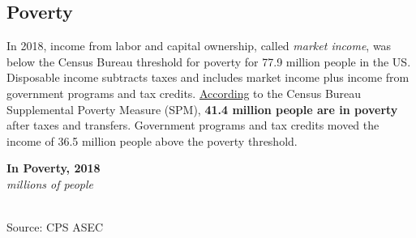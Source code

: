 \documentclass{report}
\newcommand{\barylab}[2]{yticklabel style={text width=#1, align=right, 
		style={black!70}, text height=#2},}
\newcommand{\bbar}[2]{extra #1 ticks = {{#2}}, extra #1 tick labels = ,
		extra #1 tick style = {grid=major, grid style={thick, black!25}},}
\newcommand{\barplotnogrid}{xbar=0pt, axis line style={draw=none},
	    yticklabel style={align=left, anchor=east},
      		xmajorticks=false, ymajorgrids=false,   
	    ytick=data, tickwidth=0pt, area legend, reverse legend,
	    nodes near coords, nodes near coords align={horizontal},}
\begin{document}
{{{{{\newpage
\subsection*{\color{black!70} \seriffont Poverty}
\begin{minipage}{0.46\textwidth}
\small
In 2018, income from labor and capital ownership, called \textit{market income}, was below the Census Bureau threshold for poverty for 77.9 million people in the US. Disposable income subtracts taxes and includes market income plus income from government programs and tax credits. \href{https://www.census.gov/library/publications/2019/demo/p60-268.html}{According} to the Census Bureau Supplemental Poverty Measure (SPM), \textbf{41.4 million people are in poverty} after taxes and transfers. Government programs and tax credits moved the income of 36.5 million people above the poverty threshold.
\end{minipage} \hspace{6mm}
\begin{minipage}{0.22\textwidth}
\noindent \normalsize \textbf{In Poverty, 2018}\\
\footnotesize{\textit{millions of people}}\\ 
  \noindent \hspace*{-4mm} \\
\footnotesize{Source: CPS ASEC}\\
\end{minipage}
\vspace{1mm}

}}}}}
\end{document}
